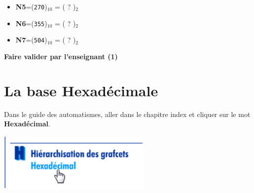 \documentclass{article}
\begin{document}
\begin{enumerate}
\begin{itemize}
\vspace{1em}
\begin{Form}
	\TextField[name=r104,width=\linewidth,height=2.5em,multiline=true,default=N4=]{}
\end{Form}
			\item \textbf{N5}=(\texttt{270})$_{10}$ = ( ? )$_{2}$\\
\vspace{1em}
\begin{Form}
	\TextField[name=r105,width=\linewidth,height=2.5em,multiline=true,default=N5=]{}
\end{Form}
			\item \textbf{N6}=(\texttt{355})$_{10}$ = ( ? )$_{2}$\\
\vspace{1em}
\begin{Form}
	\TextField[name=r106,width=\linewidth,height=2.5em,multiline=true,default=N6=]{}
\end{Form}
			\item \textbf{N7}=(\texttt{504})$_{10}$ = ( ? )$_{2}$\\
\vspace{1em}
\begin{Form}
	\TextField[name=r107,width=\linewidth,height=2.5em,multiline=true,default=N7=]{}
\end{Form}
		\end{itemize}
\end{enumerate}

\begin{center}
	\vspace{2em}
	\Large
	\textbf{Faire valider par l'enseignant (1)}
\end{center}

\section{La base Hexadécimale}
Dans le guide des automatismes, aller dans le chapitre \og{}index\fg{} et cliquer sur le mot \textbf{Hexadécimal}.

\begin{center}
	\includegraphics[width=.3\linewidth]{./figures/gda2.png}
\end{center}
\end{document}
